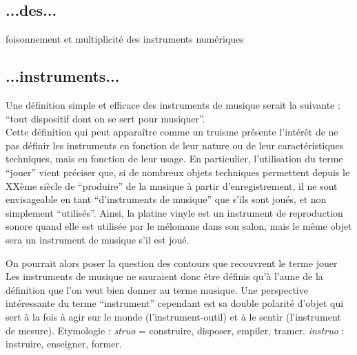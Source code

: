 \subsection*{...des...}
foisonnement et multiplicité des instruments numériques

\subsection*{...instruments...}
Une définition simple et efficace des instruments de musique serait la suivante : ``tout dispositif dont on se sert pour musiquer''.\\
Cette définition qui peut apparaître comme un truisme présente l'intérêt de ne pas définir les instruments en fonction de leur nature ou de leur caractéristiques techniques, mais en fonction de leur usage. En particulier, l'utilisation du terme ``jouer'' vient préciser que, si de nombreux objets techniques permettent depuis le XXème siècle de ``produire'' de la musique à partir d'enregistrement, il ne sont envisageable en tant ``d'instruments de musique'' que s'ils sont joués, et non simplement ``utilisés''. Ainsi, la platine vinyle est un instrument de reproduction sonore quand elle est utilisée par le mélomane dans son salon, mais le même objet sera un instrument de musique s'il est joué.

On pourrait alors poser la question des contours que recouvrent le terme jouer
Les instruments de musique ne sauraient donc être définis qu'à l'aune de la définition que l'on veut bien donner au terme musique. Une perspective intéressante du terme ``instrument'' cependant est sa double polarité d'objet qui sert à la fois à agir sur le monde (l'instrument-outil) et à le sentir (l'instrument de mesure).
Etymologie : \textit{struo} = construire, disposer, empiler, tramer.  \textit{instruo} : instruire, enseigner, former.

\cite{small_musicking:_1998}


